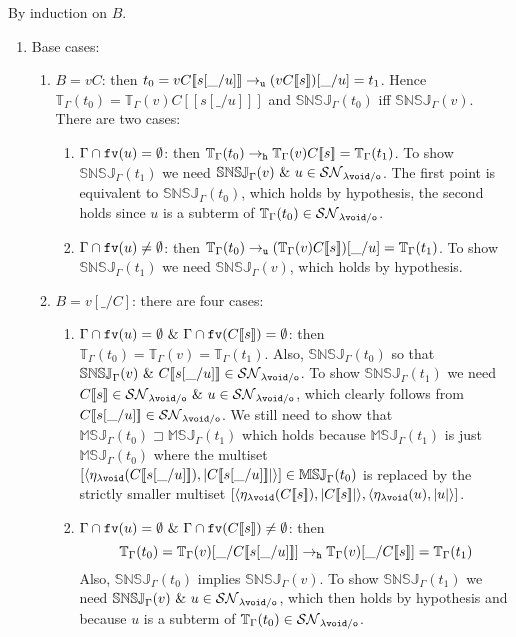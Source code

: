\documentclass{LMCS}
\renewcommand{\>}{\rightarrow}
\def\lam{\lambda}
\def\Gam{\Gamma}
\newcommand{\Rew}[1]{\rightarrow_{#1}}
\newcommand{\SN}[1]{\mathcal{SN}_{#1}}
\newcommand{\multiset}[1]{ [ #1 ] }
\newcommand{\pair}[2]{\langle #1, #2 \rangle}
\newcommand{\fv}[1]{{\tt fv}(#1)}
\newcommand{\ems}{\emptyset}
\newcommand{\unboxed}{{\tt u}}
\newcommand{\modulo}[2]{#1/#2}
\newcommand{\osymb}{{\tt o}}
\newcommand{\aux}{{\tt void}}
\newcommand{\laux}{\lam\aux}
\newcommand{\lauxm}{\lam\modulo{ \aux }{ \osymb }}
\newcommand{\New}{{\tt h}}
\newcommand{\snsudd}[2]{\mathbb{SNSJ}_{#1}(#2)}
\newcommand{\ctx}[2]{#1 [ \! [#2] \! ]}
\newcommand{\etamd}[2]{\mathbb{MSJ}_{#1}(#2)}
\newcommand{\surf}[2]{\mathbb{T}_{#1}(#2)}
\newcommand{\void}{\_}
\newcommand{\gm}{\sqsupset}
\begin{document}
\proof
By induction on $B$.
\begin{enumerate}[$\bullet$]
\item Base cases:
\begin{enumerate}[$-$]
\item $B =v C$: then 
  $t_0=v \ctx{C}{s[\void/u]} \Rew{\unboxed} (v \ctx{C}{s})[\void/u] = t_1$. Hence
  $\surf{\Gam}{t_0}=\surf{\Gam}{v} \ctx{C}{s[\void/u]}$ and
  $\snsudd{\Gam}{t_0}$ iff $\snsudd{\Gam}{v}$. There are two cases:
\begin{enumerate}[(1)]
  \item \underline{$\Gamma \cap\fv{u}=\ems$}: then 
    $\surf{\Gam}{t_0}\Rew{\New}\surf{\Gam}{v} \ctx{C}{s}=\surf{\Gam}{t_1}$. To show 
    $\snsudd{\Gam}{t_1}$ we need  $\snsudd{\Gam}{v}\ \&\ 
    u\in\SN{\lauxm}$. The first point is equivalent to
    $\snsudd{\Gam}{t_0}$, which holds by hypothesis, the second 
    holds since  $u$ is a
    subterm of $\surf{\Gam}{t_0} \in \SN{\lauxm}$.
\item \underline{$\Gamma \cap\fv{u}\neq\ems$}: then 
  $\surf{\Gam}{t_0}\Rew{\unboxed}
  (\surf{\Gam}{v} \ctx{C}{s})[\void/u]=\surf{\Gam}{t_1}$. To show 
  $\snsudd{\Gam}{t_1}$ we need  $\snsudd{\Gam}{v}$, which holds by hypothesis. 
 \end{enumerate}
\item $B =v [\void/C]$: there are four cases:
\begin{enumerate}[(1)]

\item \emph{$\Gam\cap\fv{u}=\ems\ \&\ \Gam\cap\fv{\ctx{C}{s}}=\ems$}:
    then 
    $\surf{\Gam}{t_0}=\surf{\Gam}{v}=\surf{\Gam}{t_1}$. Also, $\snsudd{\Gam}{t_0}$
    so that  
    $\snsudd{\Gam}{v}\ \&\ \ctx{C}{s[\void/u]}\in\SN{\lauxm}$. To show 
    $\snsudd{\Gam}{t_1}$ we need 
    $\ctx{C}{s}\in\SN{\lauxm}\ \&\ u\in\SN{\lauxm}$, which clearly
    follows from $\ctx{C}{s[\void/u]}\in\SN{\lauxm}$. We still 
    need to  show that
    $\etamd{\Gam}{t_0} \gm\etamd{\Gam}{t_1}$ which holds because
    $\etamd{\Gam}{t_1}$ is just $\etamd{\Gam}{t_0}$ where 
    the multiset $           \multiset{\pair{\eta_{\laux}(\ctx{C}{s[\void/u]})}{|\ctx{C}{s[\void/u]}|}}
    \in \etamd{\Gam}{t_0}$ is replaced by the strictly smaller multiset
    $\multiset{\pair{\eta_{\laux}(\ctx{C}{s})}{|\ctx{C}{s}|},
      \pair{\eta_{\laux}(u)}{|u|}}$. 

\item \emph{$\Gam\cap\fv{u}=\ems\ \&\ \Gam\cap\fv{\ctx{C}{s}}\neq\ems$}: 
   then 
  \[ \surf{\Gam}{t_0}=\surf{\Gam}{v}[\void/\ctx{C}{s[\void/u]}]\Rew{\New}\surf{\Gam}{v}[\void/\ctx{C}{s}]= \surf{\Gam}{t_1}\] 
  Also, 
  $\snsudd{\Gam}{t_0}$ implies $\snsudd{\Gam}{v}$. 
  To show 
  $\snsudd{\Gam}{t_1}$ we need $\snsudd{\Gam}{v}\ \&\ u\in\SN{\lauxm}$,
  which then holds by hypothesis and because $u$ is a subterm of
  $\surf{\Gam}{t_0} \in \SN{\lauxm}$.



\end{enumerate}
\end{enumerate}
\end{enumerate}
\end{document}
